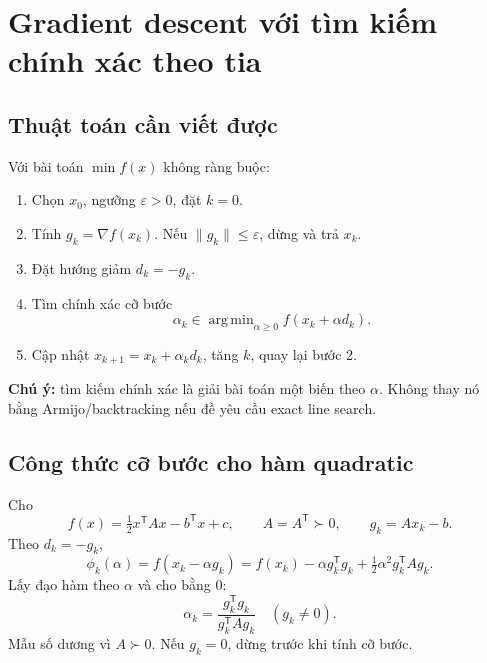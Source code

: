 \documentclass[11pt,a4paper]{article}
\newcommand{\grad}{\nabla}
\newcommand{\T}{^{\mathsf T}}
\DeclareMathOperator*{\argmin}{arg\,min}
\begin{document}
\section{Gradient descent với tìm kiếm chính xác theo tia}
\subsection{Thuật toán cần viết được}
Với bài toán \(\min f(x)\) không ràng buộc:
\begin{enumerate}
\item Chọn \(x_0\), ngưỡng \(\varepsilon>0\), đặt \(k=0\).
\item Tính \(g_k=\grad f(x_k)\). Nếu \(\|g_k\|\le\varepsilon\), dừng và trả \(x_k\).
\item Đặt hướng giảm \(d_k=-g_k\).
\item Tìm chính xác cỡ bước
\[
\alpha_k\in\argmin_{\alpha\ge0} f(x_k+\alpha d_k).
\]
\item Cập nhật \(x_{k+1}=x_k+\alpha_kd_k\), tăng \(k\), quay lại bước 2.
\end{enumerate}
\textbf{Chú ý:} tìm kiếm chính xác là giải bài toán một biến theo \(\alpha\). Không thay nó bằng Armijo/backtracking nếu đề yêu cầu exact line search.

\subsection{Công thức cỡ bước cho hàm quadratic}
Cho
\[
f(x)=\tfrac12x\T Ax-b\T x+c,\qquad A=A\T\succ0,\qquad g_k=Ax_k-b.
\]
Theo \(d_k=-g_k\),
\[
\phi_k(\alpha)=f(x_k-\alpha g_k)
=f(x_k)-\alpha g_k\T g_k+\tfrac12\alpha^2g_k\T Ag_k.
\]
Lấy đạo hàm theo \(\alpha\) và cho bằng \(0\):
\[
\boxed{\alpha_k=\frac{g_k\T g_k}{g_k\T Ag_k}}\quad(g_k\ne0).
\]
Mẫu số dương vì \(A\succ0\). Nếu \(g_k=0\), dừng trước khi tính cỡ bước.

\clearpage
\end{document}
